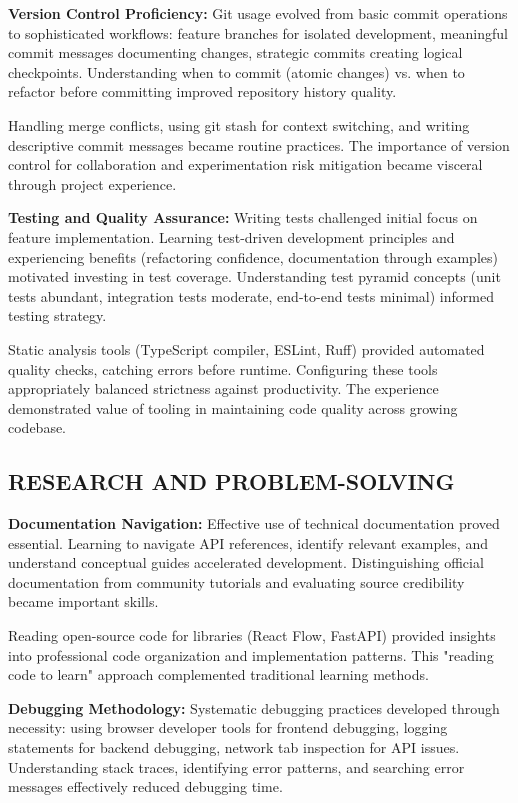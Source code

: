 \documentclass[12pt]{article}
\begin{document}
\hspace{\parindent}\textbf{Version Control Proficiency:} Git usage evolved from basic commit operations to sophisticated workflows: feature branches for isolated development, meaningful commit messages documenting changes, strategic commits creating logical checkpoints. Understanding when to commit (atomic changes) vs. when to refactor before committing improved repository history quality.

Handling merge conflicts, using git stash for context switching, and writing descriptive commit messages became routine practices. The importance of version control for collaboration and experimentation risk mitigation became visceral through project experience.

\hspace{\parindent}\textbf{Testing and Quality Assurance:} Writing tests challenged initial focus on feature implementation. Learning test-driven development principles and experiencing benefits (refactoring confidence, documentation through examples) motivated investing in test coverage. Understanding test pyramid concepts (unit tests abundant, integration tests moderate, end-to-end tests minimal) informed testing strategy.

Static analysis tools (TypeScript compiler, ESLint, Ruff) provided automated quality checks, catching errors before runtime. Configuring these tools appropriately balanced strictness against productivity. The experience demonstrated value of tooling in maintaining code quality across growing codebase.

\subsection{RESEARCH AND PROBLEM-SOLVING}

\hspace{\parindent}\textbf{Documentation Navigation:} Effective use of technical documentation proved essential. Learning to navigate API references, identify relevant examples, and understand conceptual guides accelerated development. Distinguishing official documentation from community tutorials and evaluating source credibility became important skills.

Reading open-source code for libraries (React Flow, FastAPI) provided insights into professional code organization and implementation patterns. This "reading code to learn" approach complemented traditional learning methods.

\hspace{\parindent}\textbf{Debugging Methodology:} Systematic debugging practices developed through necessity: using browser developer tools for frontend debugging, logging statements for backend debugging, network tab inspection for API issues. Understanding stack traces, identifying error patterns, and searching error messages effectively reduced debugging time.
\end{document}
